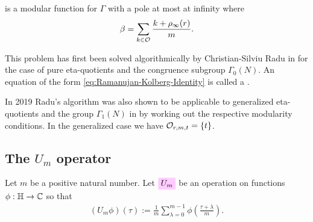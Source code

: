 \documentclass{article}
\begin{document}
is a modular function for $\Gamma$ with a pole at most at infinity where
\begin{gather}
  \beta = \sum_{k\in\mathcal{O}_{}} \frac{k + \rho_\infty(r)}{m}.
  \label{eq:beta}
\end{gather}

This problem has first been solved algorithmically by Christian-Silviu
Radu in \cite{Radu_RamanujanKolberg_2015} for the case of pure
eta-quotients and the congruence subgroup $\Gamma_0(N)$.
%
An equation of the form \eqref{eq:Ramanujan-Kolberg-Identity} is
called a .

In 2019 Radu's algorithm was also shown to be applicable to generalized
eta-quotients and the group $\Gamma_1(N)$ in
\cite{ChenDuZhao_FindingModularFunctionsRamanujan_2019} by working out
the respective modularity conditions.
%
In the generalized case we have $\mathcal{O}_{r,m,t}=\left\{t\right\}$.



\subsection{The $U_m$ operator}

Let $m$ be a positive natural number.
%
Let $\defineNotation[U-m]{U_m}$ be an operation on functions
$\phi: \mathbb{H}\to\mathbb{C}$ so that
\begin{gather}
  (U_m\phi)(\tau) := \frac{1}{m}\sum_{\lambda=0}^{m-1}
  \phi\left(\frac{\tau+\lambda}{m}\right).
  \label{eq:U_m}
\end{gather}
\end{document}
